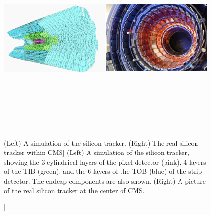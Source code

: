 \begin{figure}[h]
\centering
\includegraphics[width=0.49\textwidth,height=10cm,keepaspectratio]{figures/cms/tracker/silicon_tracker_simulated.png}
\includegraphics[width=0.49\textwidth,height=10cm,keepaspectratio]{figures/cms/tracker/silicon_tracker_real.jpg}
    \caption
        [(Left) A simulation of the silicon tracker. (Right) The real silicon tracker within CMS]
        {
        (Left) A simulation of the silicon tracker, showing the 3 cylindrical layers of the pixel detector (pink), 4 layers of the TIB (green), and the 6 layers of the TOB (blue) of the strip detector.
        The endcap components are also shown.
        (Right) A picture of the real silicon tracker at the center of CMS.
        } 
    \label{fig:tracker_real}
\end{figure}
